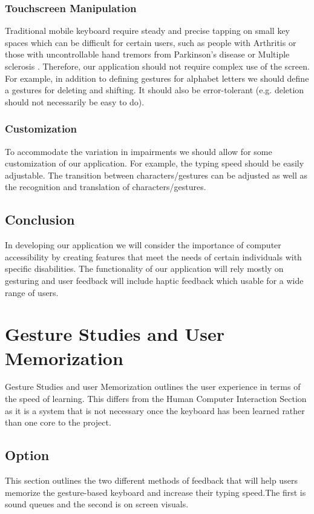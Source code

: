 \documentclass[onecolumn, draftclsnofoot,10pt, journal, letterpaper]{IEEEtran}
\begin{document}
    \subsubsection{Touchscreen Manipulation}
        Traditional mobile keyboard require steady and precise tapping on small key spaces which can be difficult for certain users, such as people with Arthritis or those with uncontrollable hand tremors from Parkinson's disease or Multiple sclerosis \cite{webaim}. Therefore, our application should not require complex use of the screen. For example, in addition to defining gestures for alphabet letters we should define a gestures for deleting and shifting. It should also be error-tolerant (e.g. deletion should not necessarily be easy to do).
    \subsubsection{Customization}
        To accommodate the variation in impairments we should allow for some customization of our application. For example, the typing speed should be easily adjustable. The transition between characters/gestures can be adjusted as well as the recognition and translation of characters/gestures.
    \subsection{Conclusion}
        In developing our application we will consider the importance of computer accessibility by creating features that meet the needs of certain individuals with specific disabilities. The functionality of our application will rely mostly on gesturing and user feedback will include haptic feedback which usable for a wide range of users.
        
\section{Gesture Studies and User Memorization}

    Gesture Studies and user Memorization outlines the user experience in terms of the speed of learning. This differs from the Human Computer Interaction Section as it is a system that is not necessary once the keyboard has been learned rather than one core to the project.
    
    \subsection{Option}
        This section outlines the two different methods of feedback that will help users memorize the gesture-based keyboard and increase their typing speed.The first is sound queues and the second is on screen visuals.
        
\end{document}
